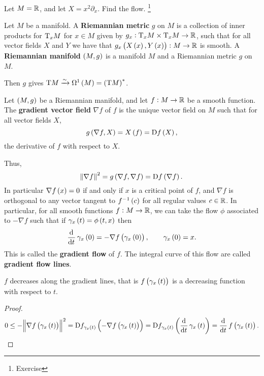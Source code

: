 \begin{example*}
Let $ M = \mathbb{R} $, and let $ X = x^2\partial_x $. Find the flow. \footnote{Exercise}
\end{example*}

\pagebreak

\begin{definition}
Let $ M $ be a manifold. A \textbf{Riemannian metric} $ g $ on $ M $ is a collection of inner products for $ \mathrm{T}_xM $ for $ x \in M $ given by $ g_x : \mathrm{T}_xM \times \mathrm{T}_xM \to \mathbb{R} $, such that for all vector fields $ X $ and $ Y $ we have that $ g_x\br{X\br{x}, Y\br{x}} : M \to \RR $ is smooth. A \textbf{Riemannian manifold} $ \br{M, g} $ is a manifold $ M $ and a Riemannian metric $ g $ on $ M $.
\end{definition}

Then $ g $ gives $ \T M \xrightarrow{\sim} \Omega^1\br{M} = \br{\T M}^* $.

\begin{definition}
Let $ \br{M, g} $ be a Riemannian manifold, and let $ f : M \to \mathbb{R} $ be a smooth function. The \textbf{gradient vector field} $ \nabla f $ of $ f $ is the unique vector field on $ M $ such that for all vector fields $ X $,
$$ g\br{\nabla f, X} = X\br{f} = \D f\br{X}, $$
the derivative of $ f $ with respect to $ X $.
\end{definition}

Thus,
$$ \norm{\nabla f}^2 = g\br{\nabla f, \nabla f} = \D f\br{\nabla f}. $$
In particular $ \nabla f\br{x} = 0 $ if and only if $ x $ is a critical point of $ f $, and $ \nabla f $ is orthogonal to any vector tangent to $ f^{-1}\br{c} $ for all regular values $ c \in \mathbb{R} $. In particular, for all smooth functions $ f : M \to \mathbb{R} $, we can take the flow $ \phi $ associated to $ -\nabla f $ such that if $ \gamma_x\br{t} = \phi\br{t, x} $ then
$$ \dod{}{t}\gamma_x\br{0} = -\nabla f\br{\gamma_x\br{0}}, \qquad \gamma_x\br{0} = x. $$
This is called the \textbf{gradient flow} of $ f $. The integral curve of this flow are called \textbf{gradient flow lines}.

\begin{lemma}
$ f $ decreases along the gradient lines, that is $ f\br{\gamma_x\br{t}} $ is a decreasing function with respect to $ t $.
\end{lemma}

\begin{proof}
$$ 0 \le -\norm{\nabla f\br{\gamma_x\br{t}}}^2 = \D f_{\gamma_x\br{t}}\br{-\nabla f\br{\gamma_x\br{t}}} = \D f_{\gamma_x\br{t}}\br{\dod{}{t}\gamma_x\br{t}} = \dod{}{t}f\br{\gamma_x\br{t}}. $$
\end{proof}

